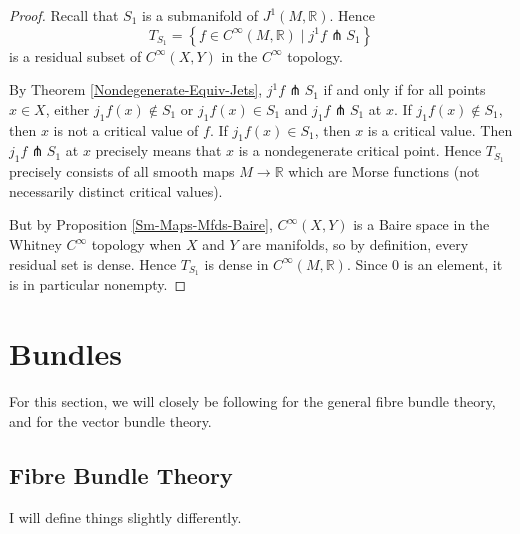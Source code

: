 \documentclass[reqno]{amsart}
\theoremstyle{definition}
\theoremstyle{remark}
\begin{document}
 \begin{proof}

     Recall that $S_1 $ is a submanifold of
     $J^{1}(M, \mathbb{R})$.
     Hence
     \[
     T_{S_1} = 
     \left\{ f \in C^{\infty}(M,\mathbb{R})
      \mid j^{1}f \pitchfork S_1 \right\} 
     \] 
     is a residual subset of
     $C^{\infty}(X,Y)$ in the $C^{\infty}$ topology.

     By Theorem \ref{Nondegenerate-Equiv-Jets},
     $j^{1}f \pitchfork S_1$ if and only if
     for all points
     $x \in X$, either
     $j_1f (x) \not\in S_1$ or
     $j_1f(x) \in S_1$ and
     $j_1f \pitchfork S_1$ at $x$.
     If $j_1f(x) \not\in S_1$, then
     $x$ is not a critical value of $f$.
     If $j_1f(x) \in S_1$, then
     $x$ is a critical value. Then
     $j_1f \pitchfork S_1$ at $x$ precisely means
     that $x$ is a nondegenerate critical point.
     Hence
     $T_{S_1}$ precisely consists of all
     smooth maps $M \to \mathbb{R}$ which are Morse functions
     (not necessarily distinct critical values).

     But by Proposition \ref{Sm-Maps-Mfds-Baire},
     $C^{\infty}(X,Y)$ is a Baire space in the
     Whitney $C^{\infty}$ topology when
     $X$ and $Y$ are manifolds, so by
     definition, every residual set is dense. Hence
     $T_{S_1}$ is dense in
     $C^{\infty}(M,\mathbb{R})$. Since 
     $0$ is an element, it is in particular nonempty.




 \end{proof}













\newpage
\section{Bundles}

For this section, we will closely be following
\cite{Steenrod} for the general fibre bundle theory, and
\cite{LeeSM} for the vector bundle theory. 

    \subsection{Fibre Bundle Theory}
    I will define things slightly differently.
\end{document}
